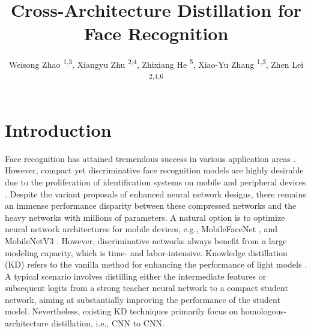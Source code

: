 \documentclass[sigconf]{acmart}
\title{Cross-Architecture Distillation for Face Recognition}
\author{
    Weisong Zhao \textsuperscript{\rm1,3},
    Xiangyu Zhu \textsuperscript{\rm2,4\authornotemark[1]},
    Zhixiang He \textsuperscript{\rm5},
    Xiao-Yu Zhang \textsuperscript{\rm1,3},
    Zhen Lei \textsuperscript{\rm2,4,6} 
}
\affiliation{
    \textsuperscript{\rm 1}Institute of Information Engineering, Chinese Academy of Sciences, Beijing, China\\
\textsuperscript{\rm 2} CBSR\&NLPR, Institute of Automation, Chinese Academy of Sciences, Beijing, China\\
\textsuperscript{\rm 3} School of Cyber Security, University of Chinese Academy of Sciences, Beijing, China\\
\textsuperscript{\rm 4} School of Artificial Intelligence, University of Chinese Academy of Sciences \city{Beijing} \country{China}\\
\textsuperscript{\rm 5} China Telecom Corporation Ltd. Data \& AI Technology Company\\
\textsuperscript{\rm 6} Centre for Artificial Intelligence and Robotics, Hong Kong Institute of Science \& Innovation,\\
Chinese Academy of Sciences, Hong Kong, China\\
   \{zhaoweisong, zhangxiaoyu\}@iie.ac.cn, hezx3@chinatelecom.cn, \{xiangyu.zhu, zlei\}@nlpr.ia.ac.cn
%
}
\begin{document}
\maketitle
\section{Introduction}
Face recognition has attained tremendous success in various application areas \cite{liziqing, leizhen, spl}. However, compact yet discriminative face recognition models are highly desirable due to the proliferation of identification systems on mobile and peripheral devices \cite{ekd}. Despite the variant proposals of enhanced neural network designs, there remains an immense performance disparity between these compressed networks and the heavy networks with millions of parameters. A natural option is to optimize neural network architectures for mobile devices, e.g., MobileFaceNet \cite{mobilefacenet}, and MobileNetV3 \cite{mobilenetv3}. However, discriminative networks always benefit from a large modeling capacity, which is time- and labor-intensive. Knowledge distillation (KD) refers to the vanilla method for enhancing the performance of light models \cite{kd, fitnet}. A typical scenario involves distilling either the intermediate features or subsequent logits from a strong teacher neural network to a compact student network, aiming at substantially improving the performance of the student model. Nevertheless, existing KD techniques primarily focus on homologous-architecture distillation, i.e., CNN to CNN.
\end{document}
